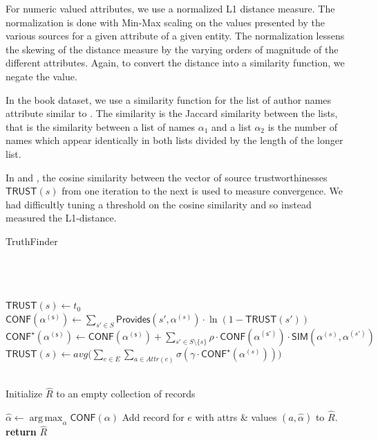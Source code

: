 \documentclass{acm_proc_article-sp}
\DeclareMathOperator*{\argmax}{arg\,max}
\begin{document}
For numeric valued attributes, we use a normalized L1 distance measure. The normalization is done with Min-Max scaling on the values presented by the various sources for a given attribute of a given entity. The normalization lessens the skewing of the distance measure by the varying orders of magnitude of the different attributes. Again, to convert the distance into a similarity function, we negate the value. 

In the book dataset, we use a similarity function for the list of author names  attribute similar to \cite{dong:integrating}. The similarity is the Jaccard similarity between the lists, that is  the similarity between a list of names $\alpha_1$ and a list $\alpha_2$  is the number of names which appear identically in both lists divided by the length of the longer list. 

In \cite{yin:truth} and \cite{waguih:truth}, the cosine similarity between the vector of source trustworthinesses $\mathsf{TRUST}(s)$ from one iteration to the next is used to measure convergence. We had difficultly tuning a threshold on the cosine similarity and so instead measured the L1-distance. 

\begin{algorithm}
\caption{TruthFinder}
\begin{algorithmic}[1]
\small
{} \\
 \\
 \\

\State $\mathsf{TRUST}(s) \leftarrow t_0$
\EndFor
\\
\State $\mathsf{CONF(\alpha^{(s)})} \leftarrow \sum_{s' \in S} \mathsf{Provides}(s',\alpha^{(s)}) \cdot \ln(1-\mathsf{TRUST}(s'))$
\EndFor
{}
\State $\mathsf{CONF^\star(\alpha^{(s)})} \leftarrow \mathsf{CONF(\alpha^{(s)})} +   \sum_{s' \in S \setminus \{s\}} \rho \cdot \mathsf{CONF(\alpha^{(s')})}  \cdot \mathsf{SIM}(\alpha^{(s)},\alpha^{(s')})$
\EndFor
\EndFor
{}
\State $\mathsf{TRUST}(s) \leftarrow avg \big ( \sum_{e \in E}\sum_{a \in Attr(e)} \sigma(\gamma \cdot \mathsf{CONF}^\star(\alpha^{(s)})) \big )$
\EndFor
\EndWhile

\\
\State Initialize $\hat{R}$ to an empty collection of records

\State $\hat{\alpha} \leftarrow \argmax_{\alpha} \mathsf{CONF}(\alpha)$
\EndFor
\State Add record for $e$ with attrs \& values $(a, \hat{\alpha})$ to $\hat{R}$.
\EndFor
\\

\State \textbf{return} $\hat{R}$
\EndFunction
\end{algorithmic}
\label{alg:tf}
\end{algorithm}  
\end{document}
